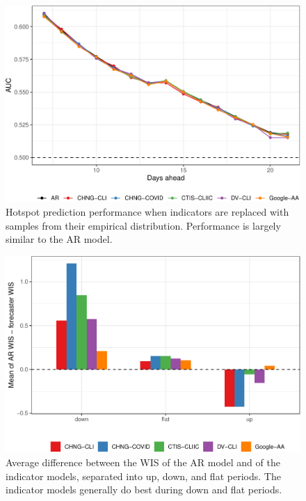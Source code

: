\clearpage

\begin{figure}

{\centering \includegraphics[width=\textwidth]{fig/hot-booted-1} 

}

\caption{Hotspot prediction performance when indicators are replaced with samples from their empirical distribution. Performance is largely similar to the AR model.}\label{fig:hot-booted}
\end{figure}

\clearpage

\begin{figure}

{\centering \includegraphics[width=\textwidth]{fig/upswing-summary-1} 

}

\caption{Average difference between the WIS of the AR model and of the indicator models, separated into up, down, and flat periods. The indicator models generally do best during down and flat periods.}\label{fig:upswing-summary}
\end{figure}

